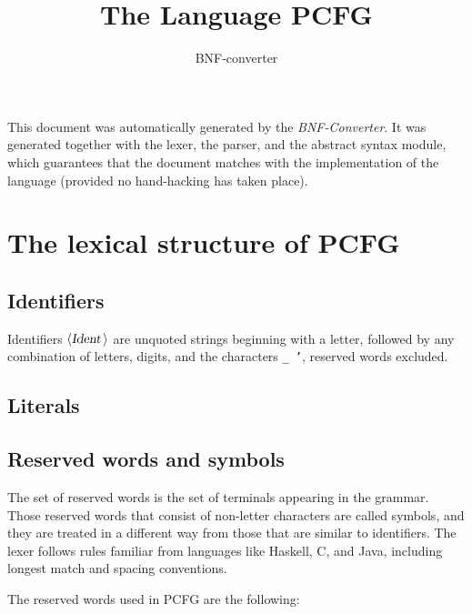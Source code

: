 \documentclass[a4paper,11pt]{article}
\author{BNF-converter}
\title{The Language PCFG}
\begin{document}
\maketitle

\newcommand{\emptyP}{\mbox{$\epsilon$}}
\newcommand{\terminal}[1]{\mbox{{\texttt {#1}}}}
\newcommand{\nonterminal}[1]{\mbox{$\langle \mbox{{\sl #1 }} \! \rangle$}}
\newcommand{\arrow}{\mbox{::=}}
\newcommand{\delimit}{\mbox{$|$}}
\newcommand{\reserved}[1]{\mbox{{\texttt {#1}}}}
\newcommand{\literal}[1]{\mbox{{\texttt {#1}}}}
\newcommand{\symb}[1]{\mbox{{\texttt {#1}}}}

This document was automatically generated by the {\em BNF-Converter}. It was generated together with the lexer, the parser, and the abstract syntax module, which guarantees that the document matches with the implementation of the language (provided no hand-hacking has taken place).

\section*{The lexical structure of PCFG}
\subsection*{Identifiers}
Identifiers \nonterminal{Ident} are unquoted strings beginning with a letter,
followed by any combination of letters, digits, and the characters {\tt \_ '},
reserved words excluded.


\subsection*{Literals}





\subsection*{Reserved words and symbols}
The set of reserved words is the set of terminals appearing in the grammar. Those reserved words that consist of non-letter characters are called symbols, and they are treated in a different way from those that are similar to identifiers. The lexer follows rules familiar from languages like Haskell, C, and Java, including longest match and spacing conventions.

The reserved words used in PCFG are the following: \\
\end{document}
